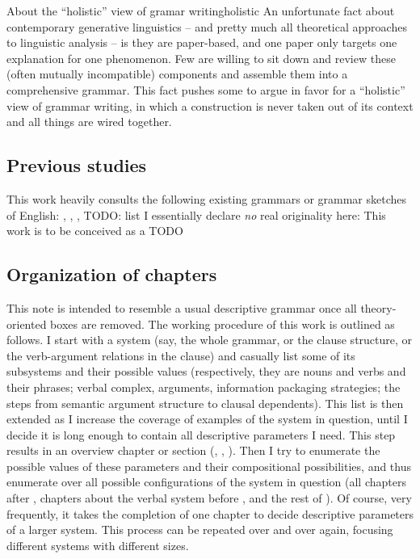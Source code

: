 \documentclass[UTF8, a4paper, oneside, scheme=plain]{ctexrep}
\begin{document}
\begin{infobox}{About the ``holistic'' view of gramar writing}{holistic}
    An unfortunate fact about contemporary generative linguistics -- 
    and pretty much all theoretical approaches to linguistic analysis -- 
    is they are paper-based,
    and one paper only targets one explanation for one phenomenon.
    Few are willing to sit down 
    and review these (often mutually incompatible) components 
    and assemble them into a comprehensive grammar. 
    This fact pushes some to argue in favor for a ``holistic'' view of grammar writing,
    in which a construction is never taken out of its context 
    and all things are wired together.
\end{infobox}

\subsection{Previous studies}

This work heavily consults the following existing grammars or grammar sketches of English:
\citet{cgel}, \citet{dixon2005semantic}, \citet{quirk1985}, TODO: list 
I essentially declare \emph{no} real originality here: 
This work is to be conceived as a TODO

\subsection{Organization of chapters}\label{sec:introduction.organization}

This note is intended to resemble a usual descriptive grammar 
once all theory-oriented boxes are removed.
The working procedure of this work is outlined as follows.
I start with a system (say, the whole grammar, 
or the clause structure,
or the verb-argument relations in the clause)
and casually list some of its subsystems and their possible values
(respectively, they are nouns and verbs and their phrases; 
verbal complex, arguments, information packaging strategies;
the steps from semantic argument structure to clausal dependents).
This list is then extended as I increase the coverage of examples of the system in question,
until I decide it is long enough to contain all descriptive parameters I need.
This step results in an overview chapter or section
(, , ).
Then I try to enumerate the possible values of these parameters 
and their compositional possibilities,
and thus enumerate over all possible configurations of the system in question
(all chapters after , 
chapters about the verbal system before ,
and the rest of ).
Of course, very frequently, it takes the completion of one chapter 
to decide descriptive parameters of a larger system.
This process can be repeated over and over again,
focusing different systems with different sizes.
\end{document}
